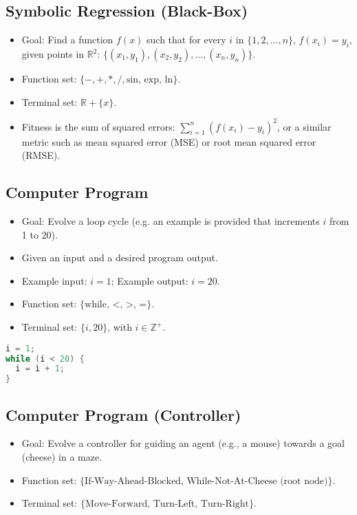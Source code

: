 \subsection*{Symbolic Regression (Black-Box)}
\begin{itemize}
 \item Goal: Find a function $f(x)$ such that for every $i$ in $\{1, 2, ..., n\}$, $f(x_i) = y_i$, given points in $\mathbb{R}^2$: $\{(x_1, y_1), (x_2, y_2), ..., (x_n, y_n)\}$.
    \item  Function set: $\{-, +, *, /, \text{sin, exp, ln}\}$.
    \item  Terminal set: $\mathbb{R} + \{x\}$.
     \item  Fitness is the sum of squared errors: $\sum_{i=1}^{n} (f(x_i) - y_i)^2$, or a similar metric such as mean squared error (MSE) or root mean squared error (RMSE).
\end{itemize}

\subsection*{Computer Program}
\begin{itemize}
    \item  Goal: Evolve a loop cycle (e.g. an example is provided that increments $i$ from 1 to 20).
    \item  Given an input and a desired program output.
  \item Example input: $i=1$; Example output: $i=20$.
    \item  Function set: $\{\text{while, <, >, =}\}$.
    \item Terminal set: $\{i, 20\}$, with $i \in \mathbb{Z}^+$.
\end{itemize}
\begin{lstlisting}[language=C]
i = 1; 
while (i < 20) {
  i = i + 1; 
}
\end{lstlisting}

\subsection*{Computer Program (Controller)}
\begin{itemize}
    \item  Goal: Evolve a controller for guiding an agent (e.g., a mouse) towards a goal (cheese) in a maze.
    \item Function set: $\{\text{If-Way-Ahead-Blocked, While-Not-At-Cheese (root node)}\}$.
    \item  Terminal set: $\{\text{Move-Forward, Turn-Left, Turn-Right}\}$.
\end{itemize}

